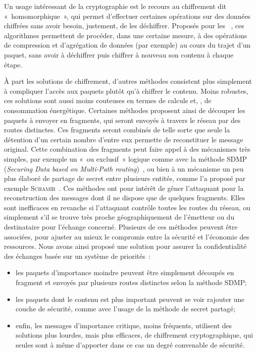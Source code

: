 Un usage intéressant de la cryptographie est le recours au chiffrement dit « homomorphique », qui permet d'effectuer certaines opérations sur des données chiffrées sans avoir besoin, justement, de les déchiffrer.
Proposés pour les \rcs~\cite{BBTY14}, ces algorithmes permettent de procéder, dans une certaine mesure, à des opérations de compression et d'agrégation de données (par exemple) au cours du trajet d'un paquet, sans avoir à déchiffrer puis chiffrer à nouveau son contenu à chaque étape.

À part les solutions de chiffrement, d'autres méthodes consistent plus simplement à compliquer l'accès aux paquets plutôt qu'à chiffrer le contenu.
Moins robustes, ces solutions sont aussi moins couteuses en termes de calculs et, \infine, de consommation énergétique.
Certaines méthodes proposent ainsi de découper les paquets à envoyer en fragments, qui seront envoyés à travers le réseau par des routes distinctes.
Ces fragments seront combinés de telle sorte que seule la détention d'un certain nombre d'entre eux permette de reconstituer le message original.
Cette combination des fragments peut faire appel à des mécanismes très simples, par exemple un « ou exclusif » logique comme avec la méthode SDMP (\textit{Securing Data based on Multi-Path routing})~\cite{BM10}, ou bien à un mécanisme un peu plus élaboré de partage de secret entre plusieurs entités, comme l'a proposé par exemple \textsc{Schamir}~\cite{Sha79}.
Ces méthodes ont pour intérêt de gêner l'attaquant pour la reconstruction des messages dont il ne dispose que de quelques fragments.
Elles sont inefficaces en revanche si l'attaquant contrôle toutes les routes du réseau, ou simplement s'il se trouve très proche géographiquement de l'émetteur ou du destinataire pour l'échange concerné.
Plusieurs de ces méthodes peuvent être associées, pour ajuster au mieux le compromis entre la sécurité et l'économie des ressources.
Nous avons ainsi proposé une solution pour assurer la confidentialité des échanges basée sur un système de priorités~\cite{MMB13}:
\begin{itemize}
    \item les paquets d'importance moindre peuvent être simplement découpés en fragment et envoyés par plusieurs routes distinctes selon la méthode SDMP;
    \item les paquets dont le contenu est plus important peuvent se voir rajouter une couche de sécurité, comme avec l'usage de la méthode de secret partagé;
    \item enfin, les messages d'importance critique, moins fréquents, utilisent des solutions plus lourdes, mais plus efficaces, de chiffrement cryptographique, qui seules sont à même d'apporter dans ce cas un degré convenable de sécurité.
\end{itemize}


